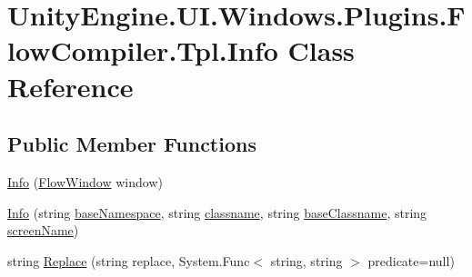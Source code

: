 \hypertarget{class_unity_engine_1_1_u_i_1_1_windows_1_1_plugins_1_1_flow_compiler_1_1_tpl_1_1_info}{}\section{Unity\+Engine.\+U\+I.\+Windows.\+Plugins.\+Flow\+Compiler.\+Tpl.\+Info Class Reference}
\label{class_unity_engine_1_1_u_i_1_1_windows_1_1_plugins_1_1_flow_compiler_1_1_tpl_1_1_info}
\subsection*{Public Member Functions}
\begin{DoxyCompactItemize}
\item 
\hyperlink{class_unity_engine_1_1_u_i_1_1_windows_1_1_plugins_1_1_flow_compiler_1_1_tpl_1_1_info_a474ea2a601de2e88be459bc4c4af733e}{Info} (\hyperlink{class_unity_engine_1_1_u_i_1_1_windows_1_1_plugins_1_1_flow_1_1_flow_window}{Flow\+Window} window)
\item 
\hyperlink{class_unity_engine_1_1_u_i_1_1_windows_1_1_plugins_1_1_flow_compiler_1_1_tpl_1_1_info_aebc962aad5972480ea18dfa92513ed4a}{Info} (string \hyperlink{class_unity_engine_1_1_u_i_1_1_windows_1_1_plugins_1_1_flow_compiler_1_1_tpl_1_1_info_aa0bbcea5d54ea9162b99b571d448786f}{base\+Namespace}, string \hyperlink{class_unity_engine_1_1_u_i_1_1_windows_1_1_plugins_1_1_flow_compiler_1_1_tpl_1_1_info_a1ace9f54a19a40d1f0581a1c378e690b}{classname}, string \hyperlink{class_unity_engine_1_1_u_i_1_1_windows_1_1_plugins_1_1_flow_compiler_1_1_tpl_1_1_info_ae709ff8981409c3d168400e8acc92d69}{base\+Classname}, string \hyperlink{class_unity_engine_1_1_u_i_1_1_windows_1_1_plugins_1_1_flow_compiler_1_1_tpl_1_1_info_afab2cf612ecd5c1065d2c1e4953e8169}{screen\+Name})
\item 
string \hyperlink{class_unity_engine_1_1_u_i_1_1_windows_1_1_plugins_1_1_flow_compiler_1_1_tpl_1_1_info_aba8b063e82c658257611f4371761aed5}{Replace} (string replace, System.\+Func$<$ string, string $>$ predicate=null)
\end{DoxyCompactItemize}
